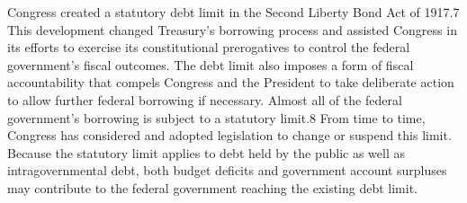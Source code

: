 \newline \newline
Congress created a statutory debt limit in the Second Liberty Bond Act of 1917.7 This development changed Treasury’s borrowing process and assisted Congress in its efforts to exercise its constitutional prerogatives to control the federal government’s fiscal outcomes. The debt limit also imposes a form of fiscal accountability that compels Congress and the President to take deliberate action to allow further federal borrowing if necessary.
\newline \newline
Almost all of the federal government’s borrowing is subject to a statutory limit.8 From time to time, Congress has considered and adopted legislation to change or suspend this limit. Because the statutory limit applies to debt held by the public as well as intragovernmental debt, both budget deficits and government account surpluses may contribute to the federal government reaching the existing debt limit.
